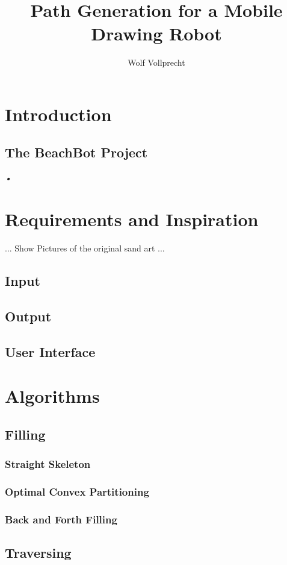 \documentclass[10pt,a4paper]{article}
\author{Wolf Vollprecht}
\title{Path Generation for a Mobile Drawing Robot}
\begin{document}
\begin{abstract}

\end{abstract}

\section{Introduction}
\subsection{The BeachBot Project}
\textsl{•}
\section{Requirements and Inspiration}

... Show Pictures of the original sand art ... 

\subsection{Input}
\subsection{Output}
\subsection{User Interface}

\section{Algorithms}

\subsection{Filling}
\subsubsection{Straight Skeleton}

\subsubsection{Optimal Convex Partitioning}
\subsubsection{Back and Forth Filling}

\subsection{Traversing}
\end{document}
